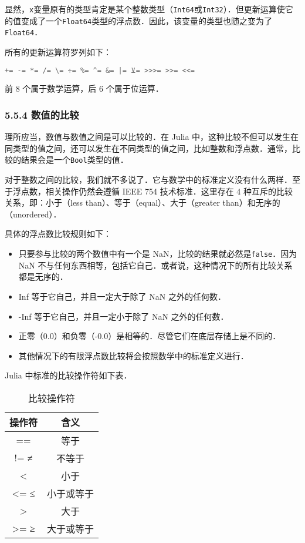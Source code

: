 显然，\verb|x|变量原有的类型肯定是某个整数类型（\verb|Int64|或\verb|Int32|）．但更新运算使它的值变成了一个\verb|Float64|类型的浮点数．因此，该变量的类型也随之变为了\verb|Float64|．

所有的更新运算符罗列如下：
\begin{lstlisting}[language=julia]
+= -= *= /= \= ÷= %= ^= &= |= ⊻= >>>= >>= <<=
\end{lstlisting}

前 8 个属于数学运算，后 6 个属于位运算．

\subsubsection{5.5.4 数值的比较}

理所应当，数值与数值之间是可以比较的．在 Julia 中，这种比较不但可以发生在同类型的值之间，还可以发生在不同类型的值之间，比如整数和浮点数．通常，比较的结果会是一个\verb|Bool|类型的值．

对于整数之间的比较，我们就不多说了．它与数学中的标准定义没有什么两样．至于浮点数，相关操作仍然会遵循 IEEE 754 技术标准．这里存在 4 种互斥的比较关系，即：小于（less than）、等于（equal）、大于（greater than）和无序的（unordered）．

具体的浮点数比较规则如下：
\begin{itemize}
\item 只要参与比较的两个数值中有一个是 NaN，比较的结果就必然是\verb|false|．因为 NaN 不与任何东西相等，包括它自己．或者说，这种情况下的所有比较关系都是无序的．
\item Inf 等于它自己，并且一定大于除了 NaN 之外的任何数．
\item -Inf 等于它自己，并且一定小于除了 NaN 之外的任何数．
\item 正零（0.0）和负零（-0.0）是相等的．尽管它们在底层存储上是不同的．
\item 其他情况下的有限浮点数比较将会按照数学中的标准定义进行．
\end{itemize}

Julia 中标准的比较操作符如下表．
\begin{table}[ht]
\centering
\caption{比较操作符}\label{JuC5S5_tab2}
\begin{tabular}{|c|c|}
\hline
操作符 & 含义 \\
\hline
== & 等于 \\
\hline
!= ≠ & 不等于 \\
\hline
< & 小于 \\
\hline
<= ≤ & 小于或等于 \\
\hline
> & 大于 \\
\hline
>= ≥ & 大于或等于 \\
\hline
\end{tabular}
\end{table}

